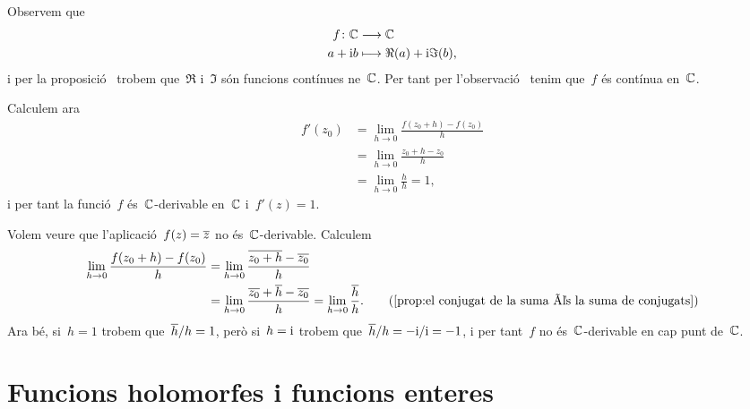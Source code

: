 \documentclass[../Apunts.tex]{subfiles}
\begin{document}
	\begin{solution}
		Observem que
		\begin{align*}
			f\colon\mathbb{C}&\longrightarrow\mathbb{C} \\
			a+\mathrm{i} b&\longmapsto \Re(a)+\mathrm{i}\Im(b),
		\end{align*}
		i per la proposició~ trobem que~\(\Re\) i~\(\Im\) són
		funcions contínues ne~\(\mathbb{C}\).
		Per tant per l'observació~ tenim que~\(f\) és contínua
		en~\(\mathbb{C}\).
		
		Calculem ara
		\begin{align*}
			f'(z_{0})&=\lim_{h\to0}\frac{f(z_{0}+h)-f(z_{0})}{h} \\
			&=\lim_{h\to0}\frac{z_{0}+h-z_{0}}{h} \\
			&=\lim_{h\to0}\frac{h}{h}=1,
		\end{align*}
		i per tant la funció~\(f\) és~\(\mathbb{C}\)-derivable en~\(\mathbb{C}\) i~\(f'(z)=1\).
	\end{solution}
	\begin{example}
		Volem veure que l'aplicació~\(f(z)=\overline{z}\) no és~\(\mathbb{C}\)-derivable.
		Calculem
		\begin{align*}
			\lim_{h\to0}\frac{f(z_{0}+h)-f(z_{0})}{h}
			&=\lim_{h\to0}\frac{\conjugat{z_{0}+h}-\conjugat{z_{0}}}{h} \\
			&=\lim_{h\to0}\frac{\conjugat{z_{0}}+\conjugat{h}-\conjugat{z_{0}}}{h}
			=\lim_{h\to0}\frac{\conjugat{h}}{h}.
			\tag{\ref{prop:el conjugat de la suma és la suma de conjugats}}
		\end{align*}
		Ara bé, si~\(h=1\) trobem que~\(\overline{h}/h=1\), però si~\(h=\mathrm{i}\)
		trobem que~\(\overline{h}/h=-\mathrm{i}/\mathrm{i}=-1\), i per tant~\(f\)
		no és~\(\mathbb{C}\)-derivable en cap punt de~\(\mathbb{C}\).
	\end{example}
\section{Funcions holomorfes i funcions enteres}
\end{document}
